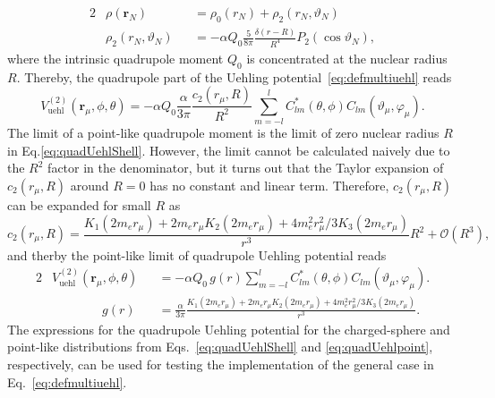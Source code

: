 \begin{alignat}{2}
&\rho(\mathbf{r}_N)&&=\rho_0(r_N) + \rho_2(r_N,\vartheta_N)\\
&\rho_2(r_N,\vartheta_N)&&=-\alpha Q_0 \frac{5}{8\pi }\frac{\delta(r-R)}{R^4}
P_2(\cos\vartheta_N),
\end{alignat}
where the intrinsic quadrupole moment $Q_0$ is concentrated at the nuclear radius $R$. Thereby, the quadrupole part of the Uehling potential~\eqref{eq:defmultiuehl} reads
\begin{equation}
V^{(2)}_{\text{uehl}}(\mathbf{r}_\mu,\phi,\theta)= 
-\alpha Q_0 \frac{\alpha}{3\pi}\frac{c_2(r_\mu,R)}{R^2}\sum\limits_{m=-l}^{l} C_{lm}^*(\theta,\phi)C_{lm}(\vartheta_\mu,\varphi_\mu).
\label{eq:quadUehlShell}
\end{equation}
The limit of a point-like quadrupole moment is the limit of zero nuclear radius $R$ in Eq.\eqref{eq:quadUehlShell}. However, the limit cannot be calculated naively due to the $R^{2}$ factor in the denominator, but it turns out that the Taylor expansion of $c_2(r_\mu,R)$ around $R=0$ has no constant and linear term. Therefore, $c_2(r_\mu,R)$ can be expanded for small $R$ as
\begin{equation}
c_2(r_\mu,R) = \frac{K_1(2m_er_\mu)+2m_er_\mu K_2(2m_er_\mu)+4m_e^2r_\mu^2/3K_3(2m_er_\mu)}{r^3}R^2 + \mathcal{O}(R^3),
\end{equation}
and therby the point-like limit of quadrupole Uehling potential reads
\begin{alignat}{2}
\label{eq:quadUehlpoint}
&V^{(2)}_{\text{uehl}}(\mathbf{r}_\mu,\phi,\theta)&&=
-\alpha Q_0\, g(r) \sum\limits_{m=-l}^{l} C_{lm}^*(\theta,\phi)C_{lm}(\vartheta_\mu,\varphi_\mu).\\
&\qquad\qquad g(r)&&=\frac{\alpha}{3\pi}\frac{K_1(2m_er_\mu)+2m_er_\mu K_2(2m_er_\mu)+4m_e^2r_\mu^2/3K_3(2m_er_\mu)}{r^3}.
\label{eq:quadUehlShellLimit}
\end{alignat}
The expressions for the quadrupole Uehling potential for the charged-sphere and point-like distributions from Eqs.~\eqref{eq:quadUehlShell} and \eqref{eq:quadUehlpoint}, respectively, can be used for testing the implementation of the general case in Eq.~\eqref{eq:defmultiuehl}.\\


